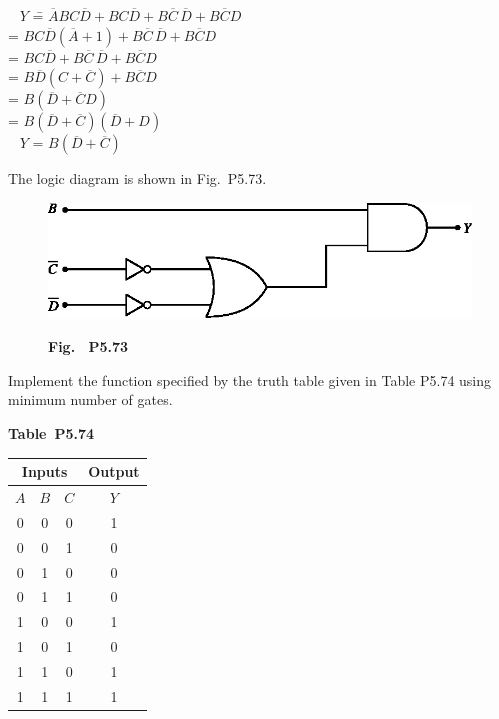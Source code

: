 \begin{solution}
\begin{tabbing}
\qquad\qquad~ $Y$ \== $\overline{A}BC\overline{D}+BC\overline{D}+B\overline{C}\,\overline{D}+B\overline{C}D$\\[4pt]
    \>= $BC\overline{D}(\overline{A}+1)+B\overline{C}\,\overline{D}+B\overline{C}D$\\[4pt]
    \>= $BC\overline{D}+B\overline{C}\,\overline{D}+B\overline{C}D$\\[4pt]
    \>= $B\overline{D}(C+\overline{C})+B\overline{C}D$\\[4pt]
    \>= $B(\overline{D}+\overline{C}D)$\\[4pt]
    \>= $B(\overline{D}+\overline{C})(\overline{D}+D)$\\[4pt]
\qquad\qquad~ $Y$ \>= $B(\overline{D}+\overline{C})$
\end{tabbing}

The logic diagram is shown in Fig.~P5.73.
\begin{figure}[H]
\centering
\includegraphics{chap5/figP5.70.eps}
\smallskip

{\bf Fig.~ P5.73}
\end{figure}
\end{solution}

\begin{problem}\label{prob5.74}
Implement the function specified by the truth table given in Table P5.74 using minimum number of gates.
\begin{table}[H]
\centering
{\bf Table~P5.74}
\medskip

\renewcommand{\arraystretch}{1.2}
\tabcolsep=10pt
\begin{tabular}{|ccc|c|}
\hline
\multicolumn{3}{|c|}{\bf Inputs} & {\bf Output}\\
\hline
\boldmath$A$ & \boldmath$B$ & \boldmath$C$ & \boldmath$Y$\\
\hline
0 & 0 & 0 & 1\\
0 & 0 & 1 & 0\\
0 & 1 & 0 & 0\\
0 & 1 & 1 & 0\\
1 & 0 & 0 & 1\\
1 & 0 & 1 & 0\\
1 & 1 & 0 & 1\\
1 & 1 & 1 & 1\\
\hline
\end{tabular}
\end{table}
\end{problem}

